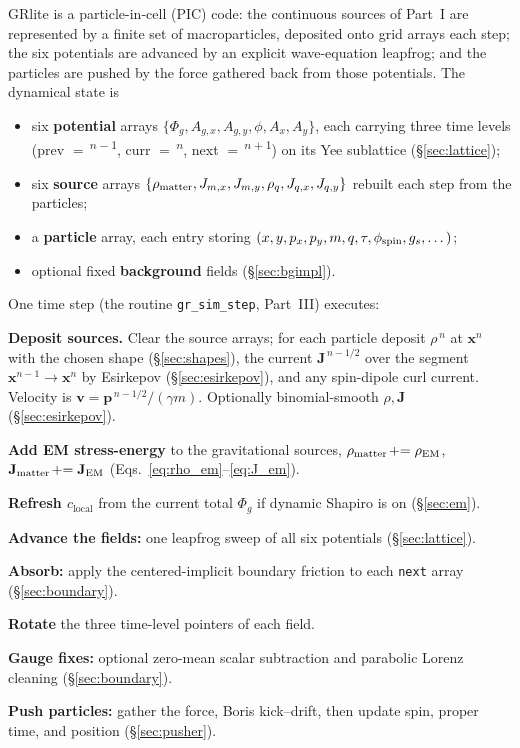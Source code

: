 \documentclass[11pt]{article}
\newcommand{\Phig}{\Phi_g}                 %
\newcommand{\vv}[1]{\mathbf{#1}}           %
\newcommand{\clocal}{c_{\mathrm{local}}}
\begin{document}
GRlite is a particle-in-cell (PIC) code: the continuous sources of
Part~I are represented by a finite set of macroparticles, deposited onto grid
arrays each step; the six potentials are advanced by an explicit wave-equation
leapfrog; and the particles are pushed by the force gathered back from those
potentials. The dynamical state is

\begin{itemize}\setlength\itemsep{2pt}
  \item six \textbf{potential} arrays $\{\Phig,A_{g,x},A_{g,y},\phi,A_x,A_y\}$,
  each carrying three time levels (prev $=\,$\textsuperscript{$n-1$},
  curr $=\,$\textsuperscript{$n$}, next $=\,$\textsuperscript{$n+1$}) on its Yee
  sublattice (\S\ref{sec:lattice});
  \item six \textbf{source} arrays
  $\{\rho_{\rm matter},J_{m,x},J_{m,y},\rho_q,J_{q,x},J_{q,y}\}$ rebuilt each
  step from the particles;
  \item a \textbf{particle} array, each entry storing
  $(x,y,p_x,p_y,m,q,\tau,\phi_{\rm spin},g_s,\dots)$;
  \item optional fixed \textbf{background} fields (\S\ref{sec:bgimpl}).
\end{itemize}

One time step (the routine \texttt{gr\_sim\_step}, Part~III) executes:

\begin{algsteps}
  \item \textbf{Deposit sources.} Clear the source arrays; for each particle
  deposit $\rho^{\,n}$ at $\vv{x}^n$ with the chosen shape (\S\ref{sec:shapes}),
  the current $\vv{J}^{\,n-1/2}$ over the segment $\vv{x}^{n-1}\!\to\vv{x}^n$ by
  Esirkepov (\S\ref{sec:esirkepov}), and any spin-dipole curl current. Velocity
  is $\vv{v}=\vv{p}^{\,n-1/2}/(\gamma m)$. Optionally binomial-smooth
  $\rho,\vv{J}$ (\S\ref{sec:esirkepov}).
  \item \textbf{Add EM stress-energy} to the gravitational sources,
  $\rho_{\rm matter}\!\mathrel{+}=\rho_{\rm EM}$, $\vv{J}_{\rm matter}\!\mathrel{+}=\vv{J}_{\rm EM}$
  (Eqs.~\eqref{eq:rho_em}--\eqref{eq:J_em}).
  \item \textbf{Refresh $\clocal$} from the current total $\Phig$ if dynamic
  Shapiro is on (\S\ref{sec:em}).
  \item \textbf{Advance the fields:} one leapfrog sweep of all six potentials
  (\S\ref{sec:lattice}).
  \item \textbf{Absorb:} apply the centered-implicit boundary friction to each
  \texttt{next} array (\S\ref{sec:boundary}).
  \item \textbf{Rotate} the three time-level pointers of each field.
  \item \textbf{Gauge fixes:} optional zero-mean scalar subtraction and
  parabolic Lorenz cleaning (\S\ref{sec:boundary}).
  \item \textbf{Push particles:} gather the force, Boris kick--drift, then update
  spin, proper time, and position (\S\ref{sec:pusher}).
\end{algsteps}
\end{document}
